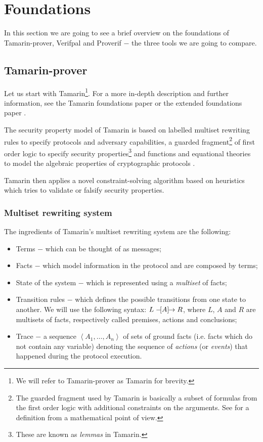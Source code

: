 
\section{Foundations}
\label{section:foundations}

In this section we are going to see a brief overview on the foundations of Tamarin-prover, Verifpal  and Proverif $-$ the three tools we are going to compare.


\subsection{Tamarin-prover}
Let us start with Tamarin\footnote{We will refer to Tamarin-prover as Tamarin for brevity.}. For a more
in-depth description and further information, see the Tamarin foundations paper \cite{TamarinFoundations} or the extended foundations paper \cite{TamarinFoundationsExtended}.

The security property model of Tamarin is based on labelled multiset rewriting rules to specify protocols and adversary capabilities, a guarded fragment\footnote{The guarded fragment used by Tamarin is basically a subset of formulas from the first order logic with additional constraints on the arguments. See \cite{FragmentFirstOrderLogicPaper} for a definition from a mathematical point of view.} of first order logic to specify security properties\footnote{These are known as \textit{lemmas} in Tamarin.} and functions and equational theories to model the algebraic properties of cryptographic protocols \cite{TamarinFoundations}.

Tamarin then applies a novel constraint-solving algorithm based on heuristics which tries to validate or falsify security properties.

\subsubsection{Multiset rewriting system}
The ingredients of Tamarin's multiset rewriting system are the following:

\begin{itemize}
    \item{Terms $-$ which can be thought of as messages;}
    \item{Facts $-$ which model information in the protocol and are composed by terms;}
    \item{State of the system $-$ which is represented using a \textit{multiset} of facts;}
    \item{Transition rules $-$ which defines the possible transitions from one state to another. We will use the following syntax: $L \mathrel{-\hspace{-2pt}[A]\hspace{-4pt}\to} R$, where $L$, $A$ and $R$ are multisets of facts, respectively called premises, actions and conclusions;}
    \item{Trace $-$ a sequence $\left<A_1, \dots, A_n\right>$ of sets of ground facts (i.e. facts which do not contain any variable) denoting the sequence of \textit{actions} (or \textit{events}) that happened during the protocol execution.}
\end{itemize}

